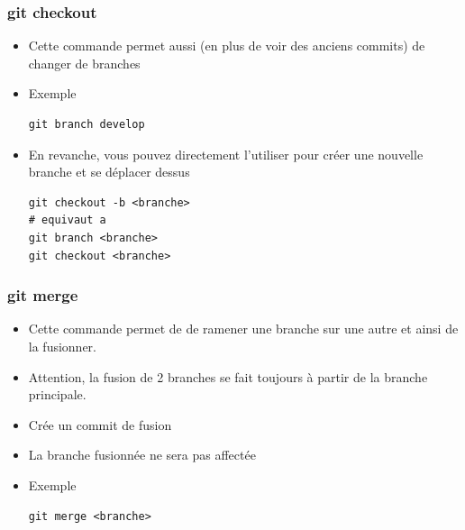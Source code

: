 \documentclass{beamer}
\begin{document}
\begin{frame}[fragile]
\frametitle{git checkout}

\begin{itemize}
\item Cette commande permet aussi (en plus de voir des anciens commits) de changer de branches
\item Exemple
\begin{lstlisting}
git branch develop
\end{lstlisting}
\item  En revanche, vous pouvez directement l'utiliser pour créer une nouvelle branche et se déplacer dessus
\begin{lstlisting}
git checkout -b <branche> 
# equivaut a 
git branch <branche>
git checkout <branche>
\end{lstlisting}
\end{itemize}
\end{frame}

\begin{frame}[fragile]
\frametitle{git merge}

\begin{itemize}
\item Cette commande permet de de ramener une branche sur une autre et ainsi de la fusionner. 
\item Attention, la fusion de 2 branches se fait toujours à partir de la branche principale.
\item Crée un commit de fusion
\item La branche fusionnée ne sera pas affectée
\item Exemple
\begin{lstlisting}
git merge <branche>
\end{lstlisting}
\end{itemize}
\end{frame}

\end{document}
